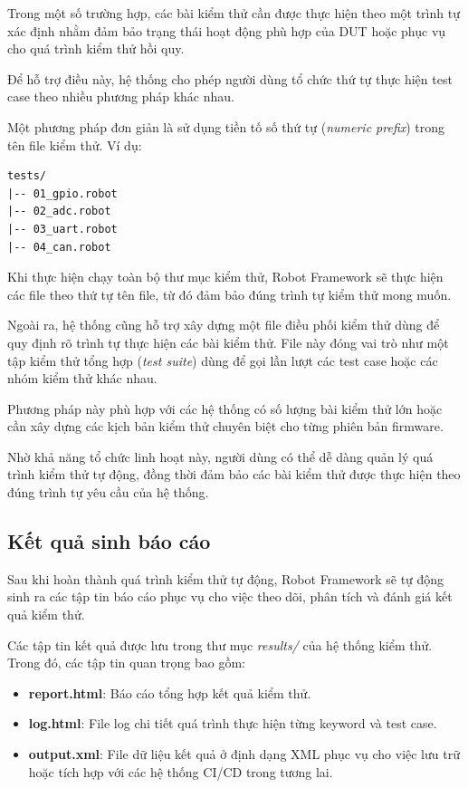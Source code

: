 Trong một số trường hợp, các bài kiểm thử cần được thực hiện theo một trình tự xác định nhằm đảm bảo trạng thái hoạt động phù hợp của DUT hoặc phục vụ cho quá trình kiểm thử hồi quy.

Để hỗ trợ điều này, hệ thống cho phép người dùng tổ chức thứ tự thực hiện test case theo nhiều phương pháp khác nhau.

Một phương pháp đơn giản là sử dụng tiền tố số thứ tự (\textit{numeric prefix}) trong tên file kiểm thử. Ví dụ:

\begin{lstlisting}[language={}]
tests/
|-- 01_gpio.robot
|-- 02_adc.robot
|-- 03_uart.robot
|-- 04_can.robot
\end{lstlisting}

Khi thực hiện chạy toàn bộ thư mục kiểm thử, Robot Framework sẽ thực hiện các file theo thứ tự tên file, từ đó đảm bảo đúng trình tự kiểm thử mong muốn.

Ngoài ra, hệ thống cũng hỗ trợ xây dựng một file điều phối kiểm thử dùng để quy định rõ trình tự thực hiện các bài kiểm thử. File này đóng vai trò như một tập kiểm thử tổng hợp (\textit{test suite}) dùng để gọi lần lượt các test case hoặc các nhóm kiểm thử khác nhau.

Phương pháp này phù hợp với các hệ thống có số lượng bài kiểm thử lớn hoặc cần xây dựng các kịch bản kiểm thử chuyên biệt cho từng phiên bản firmware.

Nhờ khả năng tổ chức linh hoạt này, người dùng có thể dễ dàng quản lý quá trình kiểm thử tự động, đồng thời đảm bảo các bài kiểm thử được thực hiện theo đúng trình tự yêu cầu của hệ thống.

\subsection{Kết quả sinh báo cáo}

Sau khi hoàn thành quá trình kiểm thử tự động, Robot Framework sẽ tự động sinh ra các tập tin báo cáo phục vụ cho việc theo dõi, phân tích và đánh giá kết quả kiểm thử.

Các tập tin kết quả được lưu trong thư mục \textit{results/} của hệ thống kiểm thử. Trong đó, các tập tin quan trọng bao gồm:

\begin{itemize}

    \item \textbf{report.html}: Báo cáo tổng hợp kết quả kiểm thử.
    
    \item \textbf{log.html}: File log chi tiết quá trình thực hiện từng keyword và test case.
    
    \item \textbf{output.xml}: File dữ liệu kết quả ở định dạng XML phục vụ cho việc lưu trữ hoặc tích hợp với các hệ thống CI/CD trong tương lai.
\end{itemize}

